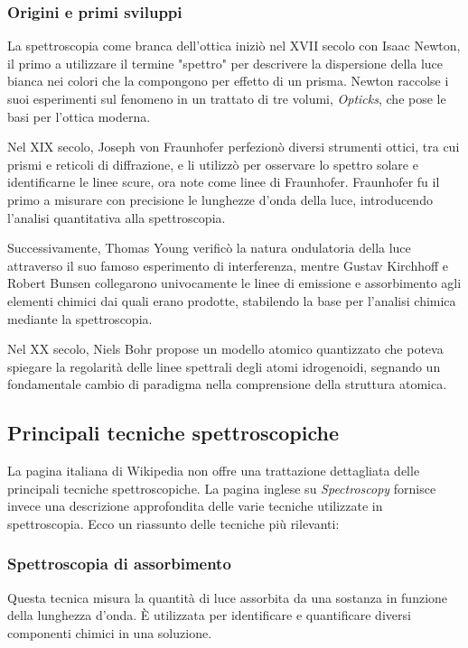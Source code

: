 \documentclass[12pt,a4paper]{report}
\begin{document}
\subsubsection{Origini e primi sviluppi}

La spettroscopia come branca dell'ottica iniziò nel XVII secolo con Isaac Newton, il primo a utilizzare il termine "spettro" per descrivere la dispersione della luce bianca nei colori che la compongono per effetto di un prisma. Newton raccolse i suoi esperimenti sul fenomeno in un trattato di tre volumi, \textit{Opticks}, che pose le basi per l'ottica moderna.

Nel XIX secolo, Joseph von Fraunhofer perfezionò diversi strumenti ottici, tra cui prismi e reticoli di diffrazione, e li utilizzò per osservare lo spettro solare e identificarne le linee scure, ora note come linee di Fraunhofer. Fraunhofer fu il primo a misurare con precisione le lunghezze d'onda della luce, introducendo l'analisi quantitativa alla spettroscopia.

Successivamente, Thomas Young verificò la natura ondulatoria della luce attraverso il suo famoso esperimento di interferenza, mentre Gustav Kirchhoff e Robert Bunsen collegarono univocamente le linee di emissione e assorbimento agli elementi chimici dai quali erano prodotte, stabilendo la base per l'analisi chimica mediante la spettroscopia.

Nel XX secolo, Niels Bohr propose un modello atomico quantizzato che poteva spiegare la regolarità delle linee spettrali degli atomi idrogenoidi, segnando un fondamentale cambio di paradigma nella comprensione della struttura atomica.

\subsection{Principali tecniche spettroscopiche}

La pagina italiana di Wikipedia non offre una trattazione dettagliata delle principali tecniche spettroscopiche. La pagina inglese su \textit{Spectroscopy} fornisce invece una descrizione approfondita delle varie tecniche utilizzate in spettroscopia. Ecco un riassunto delle tecniche più rilevanti:

\subsubsection{Spettroscopia di assorbimento}

Questa tecnica misura la quantità di luce assorbita da una sostanza in funzione della lunghezza d'onda. È utilizzata per identificare e quantificare diversi componenti chimici in una soluzione.
\end{document}
